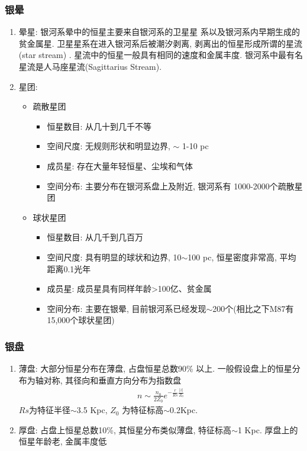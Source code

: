\subsubsection{银晕}
\begin{enumerate}\small
    \item 晕星: 银河系晕中的恒星主要来自银河系的卫星星
    系以及银河系内早期生成的贫金属星. 卫星星系在进入银河系后被潮汐剥离, 剥离出的恒星形成所谓的星流(star stream) . 星流中的恒星一般具有相同的速度和金属丰度. 银河系中最有名星流是人马座星流(Sagittarius Stream). 
    
    \item 星团: 
    \begin{itemize}
        \item 疏散星团
        \begin{itemize}\small
            \item 恒星数目: 从几十到几千不等
            \item 空间尺度: 无规则形状和明显边界, $\sim$ 1-10 pc
            \item 成员星: 存在大量年轻恒星、尘埃和气体
            \item 空间分布: 主要分布在银河系盘上及附近, 银河系有 1000-2000个疏散星团
        \end{itemize}
        \item 球状星团
        \begin{itemize}\small
            \item 恒星数目: 从几千到几百万
            \item 空间尺度: 具有明显的球状和边界, 10$\sim$100 pc, 恒星密度非常高, 平均距离0.1光年
            \item 成员星: 成员星具有同样年龄>100亿、贫金属
            \item 空间分布: 主要在银晕, 目前银河系已经发现$\sim$200个(相比之下M87有15,000个球状星团)
        \end{itemize}
    \end{itemize}
\end{enumerate}

\subsubsection{银盘}
\begin{enumerate}\small
    \item 薄盘: 大部分恒星分布在薄盘, 占盘恒星总数90\% 以上. 一般假设盘上的恒星分布为轴对称, 其径向和垂直方向分布为指数盘
    \begin{align*}
        n\sim \frac{n_0}{2Z_0}e^{-\frac{r}{Rs}\frac{|z|}{Z_0}}
    \end{align*}
    $Rs$为特征半径$\sim$3.5 Kpc, $Z_0$ 为特征标高$\sim$0.2Kpc. 
    \item 厚盘: 占盘上恒星总数10\%, 其恒星分布类似薄盘, 特征标高$\sim$1 Kpc. 厚盘上的恒星年龄老, 金属丰度低
\end{enumerate}


